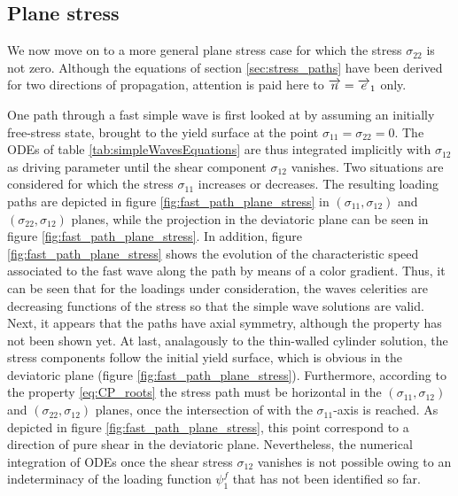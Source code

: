 \subsection{Plane stress}
\label{sec:num_plane_stress}
We now move on to a more general plane stress case for which the stress $\sigma_{22} $ is not zero.
Although the equations of section \ref{sec:stress_paths} have been derived for two directions of propagation, attention is paid here to ${\overrightarrow{n}}={\overrightarrow{e}}_1$ only.

One path through a fast simple wave is first looked at by assuming an initially free-stress state, brought to the yield surface at the point $ \sigma_{11}=\sigma_{22}=0 $.
The ODEs of table \ref{tab:simpleWavesEquations} are thus integrated implicitly with $\sigma_{12}$ as driving parameter until the shear component $\sigma_{12}$ vanishes.
Two situations are considered for which the stress $\sigma_{11}$ increases or decreases.
The resulting loading paths are depicted in figure \ref{fig:fast_path_plane_stress} in $(\sigma_{11},\sigma_{12})$ and $(\sigma_{22},\sigma_{12})$ planes, while the projection in the deviatoric plane can be seen in figure \ref{fig:fast_path_plane_stress}.
In addition, figure \ref{fig:fast_path_plane_stress} shows the evolution of the characteristic speed associated to the fast wave along the path by means of a color gradient.
Thus, it can be seen that for the loadings under consideration, the waves celerities are decreasing functions of the stress so that the simple wave solutions are valid.
Next, it appears that the paths have axial symmetry, although the property has not been shown yet.
At last, analagously to the thin-walled cylinder solution, the stress components follow the initial yield surface, which is obvious in the deviatoric plane (figure \ref{fig:fast_path_plane_stress}).
Furthermore, according to the property \eqref{eq:CP_roots} the stress path must be horizontal in the $(\sigma_{11},\sigma_{12})$ and $(\sigma_{22},\sigma_{12})$ planes, once the intersection of with the $\sigma_{11}$-axis is reached.
As depicted in figure \ref{fig:fast_path_plane_stress}, this point correspond to a direction of pure shear in the deviatoric plane.
Nevertheless, the numerical integration of ODEs once the shear stress $\sigma_{12}$ vanishes is not possible owing to an indeterminacy of the loading function $\psi_1^f$ that has not been identified so far.
